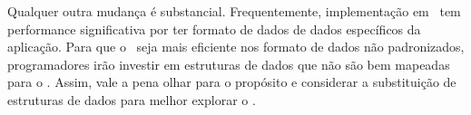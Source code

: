 		Qualquer outra mudança é substancial. Frequentemente, implementação em \hardware\ tem performance significativa por ter formato de dados de dados específicos da aplicação. Para que o \software\ seja mais eficiente nos formato de dados não padronizados, programadores irão investir em estruturas de dados que não são bem mapeadas para o \hardware. Assim, vale a pena olhar para o propósito e considerar a substituição de estruturas de dados para melhor explorar o \hardware.

